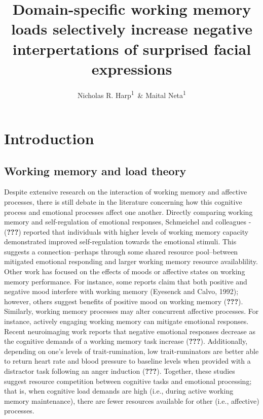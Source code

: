 \documentclass[man]{apa6}
\title{Domain-specific working memory loads selectively increase negative interpertations of surprised facial expressions}
\author{Nicholas R. Harp\textsuperscript{1}~\& Maital Neta\textsuperscript{1}}
\date{}
\affiliation{
\vspace{0.5cm}
\textsuperscript{1} University of Nebraska-Lincoln}
\begin{document}
\maketitle

\hypertarget{introduction}{%
\section{Introduction}\label{introduction}}

\hypertarget{working-memory-and-load-theory}{%
\subsection{Working memory and load theory}\label{working-memory-and-load-theory}}

Despite extensive research on the interaction of working memory and affective processes, there is still debate in the literature concerning how this cognitive process and emotional processes affect one another. Directly comparing working memory and self-regulation of emotional responses, Schmeichel and colleagues -({\textbf{???}}) reported that individuals with higher levels of working memory capacity demonstrated improved self-regulation towards the emotional stimuli. This suggests a connection--perhaps through some shared resource pool--between mitigated emotional responding and larger working memory resource availablility. Other work has focused on the effects of moods or affective states on working memory performance. For instance, some reports claim that both positive and negative mood interfere with working memory (Eyesenck and Calvo, 1992); however, others suggest benefits of positive mood on working memory ({\textbf{???}}). Similarly, working memory processes may alter concurrent affective processes. For instance, actively engaging working memory can mitigate emotional responses. Recent neuroimaging work reports that negative emotional responses decrease as the cognitive demands of a working memory task increase ({\textbf{???}}). Additionally, depending on one's levels of trait-rumination, low trait-ruminators are better able to return heart rate and blood pressure to baseline levels when provided with a distractor task following an anger induction ({\textbf{???}}). Together, these studies suggest resource competition between cognitive tasks and emotional processing; that is, when cognitive load demands are high (i.e., during active working memory maintenance), there are fewer resources available for other (i.e., affective) processes.
\end{document}
